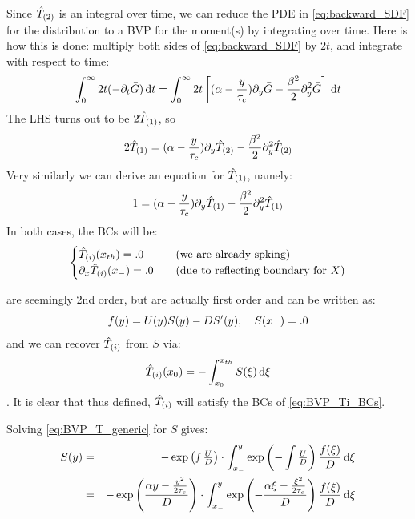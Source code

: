\documentclass{article}
\begin{document}
Since ${ \hat{T}_{(2)} }$ is an integral over time, we can reduce the PDE in
\cref{eq:backward_SDF} for the distribution to a BVP for the moment(s) by
integrating over time. Here is how this is done: multiply both sides  of
\cref{eq:backward_SDF} by $2t$, and integrate with respect to time:
\begin{equation}
\int_0^\infty 2t (-{\partial}_t { \bar{G} }) \, \mathrm{d} t
= 
\int_0^\infty  2t \left[ ({\alpha} - \frac y{{ \tau_{c} }}) {\partial}_y{ \bar{G} } - \frac {{\beta}^2} 2
{\partial}_y^2 { \bar{G} }\right]
\, \mathrm{d} t
\end{equation}
The LHS turns out to be $2{ \hat{T}_{(1)} }$, so 
\begin{equation}
2{ \hat{T}_{(1)} }
=({\alpha} - \frac y{{ \tau_{c} }})   {\partial}_y { \hat{T}_{(2)} } 
- \frac {{\beta}^2} 2
{\partial}_y^2 { \hat{T}_{(2)} }
\label{eq:BVP_Ttwo}
\end{equation}
Very similarly we can derive an equation for ${ \hat{T}_{(1)} }$, namely:
\begin{equation}
1
=({\alpha} - \frac y{{ \tau_{c} }})   {\partial}_y { \hat{T}_{(1)} } 
- \frac {{\beta}^2} 2
{\partial}_y^2 { \hat{T}_{(1)} }
\label{eq:BVP_Tone}
\end{equation}
In both cases, the BCs will be:
\begin{equation}
\begin{cases}
{ \hat{T}_{(i)} }({ x_{th} }) = .0 & \quad (\textrm{we are already spking})
\\
{\partial}_x { \hat{T}_{(i)} }({ x_{-} }) = .0  & \quad (\textrm{due to reflecting boundary for }X)
\end{cases}
\label{eq:BVP_Ti_BCs}
\end{equation}

 are seemingly 2nd order, but are actually
first order and can be written as:
\begin{equation}
f(y)
=U(y) S(y) 
- D S'(y) ; \quad  S({ x_{-} }) = .0
\label{eq:BVP_T_generic}
\end{equation}
and we can recover ${ \hat{T}_{(i)} }$ from $S$ via:
$${ \hat{T}_{(i)} }(x_0) =   -\int_{x_0}^{ x_{th} } S(\xi)\, \mathrm{d} \xi$$.
It is clear that thus defined, ${ \hat{T}_{(i)} }$ will satisfy the BCs of
\cref{eq:BVP_Ti_BCs}.

Solving \cref{eq:BVP_T_generic} for $S$ gives:
\begin{eqnarray}
S(y) &=& - \exp\left(\smallint \tfrac UD \right) \cdot \int_{ x_{-} }^{y} 
\exp\left(-\int \tfrac UD\right) \frac{f(\xi)}D
\, \mathrm{d} \xi
\\
 &=& - \exp\left( \frac{{\alpha} y - \frac{y^2}{2{ \tau_{c} }}}D \right) 
 		\cdot 
 		\int_{ x_{-} }^{y}   \exp\left(- \frac{{\alpha} \xi - \tfrac{\xi^2}{2{ \tau_{c} }}}D \right)
 		\frac{f(\xi)}D \, \mathrm{d} \xi
\label{eq:BVP_T_generic_soln}
\end{eqnarray}
\end{document}
